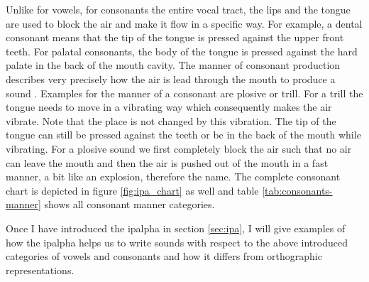 Unlike for vowels, for consonants the entire vocal tract, the lips and the tongue are used to block the air and make it flow in a specific way. For example, a dental consonant means that the tip of the tongue is pressed against the upper front teeth. For palatal consonants, the body of the tongue is pressed against the hard palate in the back of the mouth cavity.  
The manner of consonant production describes very precisely how the air is lead through the mouth to produce a sound \citep{phonetics-video}. Examples for the manner of a consonant are plosive or trill. For a trill the tongue needs to move in a vibrating way which consequently makes the air vibrate. Note that the place is not changed by this vibration. The tip of the tongue can still be pressed against the teeth or be in the back of the mouth while vibrating. For a plosive sound we first completely block the air such that no air can leave the mouth and then the air is pushed out of the mouth in a fast manner, a bit like an explosion, therefore the name. The complete consonant chart is depicted in figure \ref{fig:ipa_chart} as well and table \ref{tab:consonants-manner} shows all consonant manner categories. 


Once I have introduced the \ac{ipalpha} in section \ref{sec:ipa}, I will give examples of how the \ac{ipalpha} helps us to write sounds with respect to the above introduced categories of vowels and consonants and how it differs from orthographic representations. 

